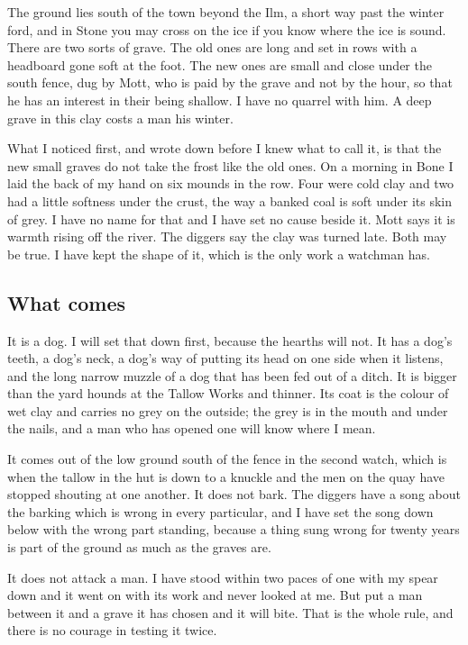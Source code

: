 \documentclass{design/chronicle}
\begin{document}
The ground lies south of the town beyond the Ilm, a short way past the winter ford, and in Stone you may cross on the ice if you know where the ice is sound. There are two sorts of grave. The old ones are long and set in rows with a headboard gone soft at the foot. The new ones are small and close under the south fence, dug by Mott, who is paid by the grave and not by the hour, so that he has an interest in their being shallow. I have no quarrel with him. A deep grave in this clay costs a man his winter.

What I noticed first, and wrote down before I knew what to call it, is that the new small graves do not take the frost like the old ones. On a morning in Bone I laid the back of my hand on six mounds in the row. Four were cold clay and two had a little softness under the crust, the way a banked coal is soft under its skin of grey. I have no name for that and I have set no cause beside it. Mott says it is warmth rising off the river. The diggers say the clay was turned late. Both may be true. I have kept the shape of it, which is the only work a watchman has.

\subsection*{What comes}

It is a dog. I will set that down first, because the hearths will not. It has a dog’s teeth, a dog’s neck, a dog’s way of putting its head on one side when it listens, and the long narrow muzzle of a dog that has been fed out of a ditch. It is bigger than the yard hounds at the Tallow Works and thinner. Its coat is the colour of wet clay and carries no grey on the outside; the grey is in the mouth and under the nails, and a man who has opened one will know where I mean.

It comes out of the low ground south of the fence in the second watch, which is when the tallow in the hut is down to a knuckle and the men on the quay have stopped shouting at one another. It does not bark. The diggers have a song about the barking which is wrong in every particular, and I have set the song down below with the wrong part standing, because a thing sung wrong for twenty years is part of the ground as much as the graves are.

It does not attack a man. I have stood within two paces of one with my spear down and it went on with its work and never looked at me. But put a man between it and a grave it has chosen and it will bite. That is the whole rule, and there is no courage in testing it twice.
\end{document}
